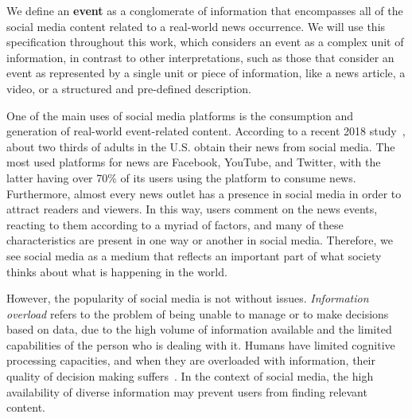 We define an {\bf event} as a conglomerate of information that encompasses all
of the social media content related to a real-world news occurrence. 
%
We will use this specification throughout this work, which considers an event as
a complex unit of information, in contrast to other interpretations, such as
those that consider an event as represented by a single unit or piece of
information, like a news article, a video, or a structured and pre-defined
description.

One of the main uses of social media platforms is the consumption and generation
of real-world event-related content. 
%
According to a recent 2018 study~\cite{pewresearch}, about two thirds of adults
in the U.S. obtain their news from social media.
%
The most used platforms for news are Facebook, YouTube, and Twitter, with the
latter having over 70\% of its users using the platform to consume news.
%
Furthermore, almost every news outlet has a presence in social media
in order to attract readers and viewers.
%
In this way, users comment on the news events, reacting to them according to a
myriad of factors, and many of these characteristics are present in one way or
another in social media.
%
Therefore, we see social media as a medium that reflects an important 
part of what society thinks about what is happening in the world.





However, the popularity of social media is not without issues. 
%
{\em Information overload} refers to the problem of being unable to manage or to
make decisions based on data, due to the high volume of information available
and the limited capabilities of the person who is dealing with it. 
%
Humans have limited cognitive processing capacities, and when they are
overloaded with information, their quality of decision making
suffers~\cite{gross1964managing}. 
%
In the context of social media, the high availability of diverse information may
prevent users from finding relevant content.


